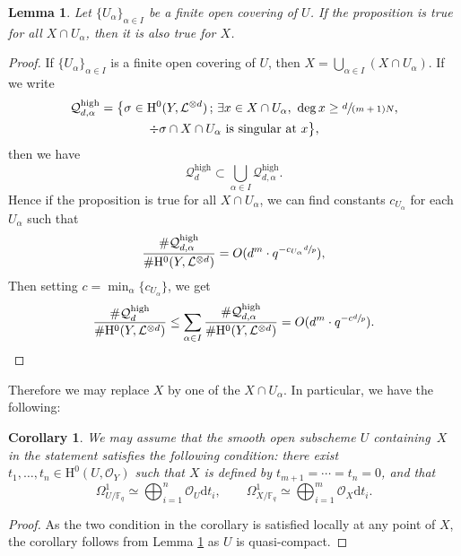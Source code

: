 \documentclass[JEP,XML,SOM,Unicode,published]{cedram}
\newcommand{\sep}{\,;\,}
\theoremstyle{plain}
\newtheorem{cor}[thm]{Corollary}
\newtheorem{lem}[thm]{Lemma}
\theoremstyle{definition}
\newcommand{\ho}{\mathrm{H}}
\newcommand{\Oc}{\mathcal{O}}
\newcommand{\li}{\mathcal{L}}
\newcommand{\F}{\mathbb{F}}
\begin{document}
\begin{lem}\label{cover}
Let $\{ U_{\alpha} \}_{\alpha\in I}$ be a finite open covering of $U$. If the proposition is true for all $X\cap U_{\alpha}$, then it is also true for $X$.
\end{lem}
\begin{proof}
If $\{ U_{\alpha} \}_{\alpha\in I}$ is a finite open covering of $U$, then $X=\bigcup_{\alpha\in I} (X\cap U_{\alpha})$. If we write\vspace*{-3pt}
\begin{multline*}
\mathcal{Q}_{d,\alpha}^{\mathrm{high}}= \bigl\{ \sigma\in \ho^0(Y,\li^{\otimes d})\sep \exists x\in X\cap U_{\alpha},\ \deg x\geq \sfrac{d}{(m+1)N},\\ \div \sigma\cap X\cap U_{\alpha} \text{ is singular at }x \bigr\},
\end{multline*}
then we have\vspace*{-3pt}
\[
\mathcal{Q}_{d}^{\mathrm{high}}\subset \bigcup_{\alpha\in I}\mathcal{Q}_{d,\alpha}^{\mathrm{high}}.
\]
Hence if the proposition is true for all $X\cap U_{\alpha}$, we can find constants $c_{U_{\alpha}}$ for each $U_{\alpha}$ such that\vspace*{-3pt}
\[
\frac{ \#\mathcal{Q}_{d,\alpha}^{\mathrm{high}}}{\# \ho^0(Y, \mathcal{L}^{\otimes d})}=O(d^{m}\cdot q^{-c_{U_{\alpha}}\sfrac{d}{p}}),
\]
Then setting $c=\min_{\alpha}\{ c_{U_{\alpha}} \}$, we get\vspace*{-3pt}
\[
\frac{ \#\mathcal{Q}_d^{\mathrm{high}}}{\# \ho^0(Y, \mathcal{L}^{\otimes d})}\leq \sum_{\alpha\in I} \frac{ \#\mathcal{Q}_{d,\alpha}^{\mathrm{high}}}{\# \ho^0(Y, \mathcal{L}^{\otimes d})}=O(d^{m}\cdot q^{-c\sfrac{d}{p}}).\qedhere
\]
\end{proof}
Therefore we may replace $X$ by one of the $X\cap U_{\alpha}$. In particular, we have the following:
\begin{cor}\label{trivi}
We may assume that the smooth open subscheme $U$ containing~$X$ in the statement satisfies the following condition: there exist $t_1, \dots, t_n\in \ho^0(U, \mathcal{O}_Y)$ such that $X$ is defined by $t_{m+1}=\cdots=t_n=0$, and that\vspace*{-3pt}
\[
\Omega_{U/\F_q}^1\simeq \bigoplus_{i=1}^n\Oc_U \mathrm{d} t_i,\qquad \Omega_{X/\F_q}^1\simeq \bigoplus_{i=1}^m\Oc_X\mathrm{d}t_i.
\]
\end{cor}
\begin{proof}[Proof]
As the two condition in the corollary is satisfied locally at any point of $X$, the corollary follows from Lemma \ref{cover} as $U$ is quasi-compact.
\end{proof}
\end{document}
